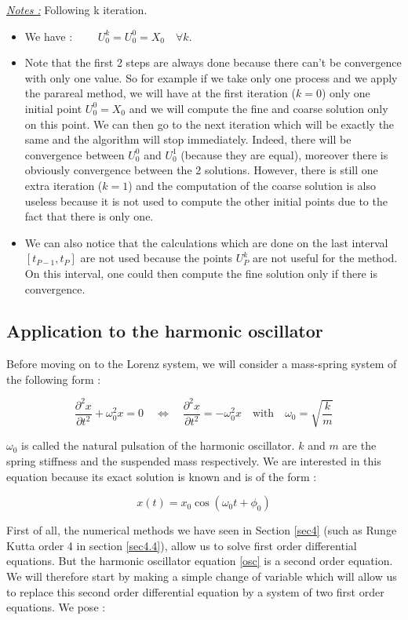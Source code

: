 \noindent \underline{\textit{Notes :}} Following k iteration.
\begin{itemize}
	\item We have : $\qquad U_0^k=U_0^0=X_0 \quad \forall k$.
	\item Note that the first 2 steps are always done because there can't be convergence with only one value. So for example if we take only one process and we apply the parareal method, we will have at the first iteration ($k=0$) only one initial point $U_0^0=X_0$ and we will compute the fine and coarse solution only on this point. We can then go to the next iteration which will be exactly the same and the algorithm will stop immediately. Indeed, there will be convergence between $U_0^0$ and $U_0^1$ (because they are equal), moreover there is obviously convergence between the 2 solutions. However, there is still one extra iteration ($k=1$) and the computation of the coarse solution is also useless because it is not used to compute the other initial points due to the fact that there is only one.
	\item We can also notice that the calculations which are done on the last interval $[t_{P-1},t_P]$ are not used because the points $U_P^k$ are not useful for the method. On this interval, one could then compute the fine solution only if there is convergence.
\end{itemize}

\subsection{Application to the harmonic oscillator}

\noindent Before moving on to the Lorenz system, we will consider a mass-spring system of the following form :

\begin{equation}
	\frac{\partial^2 x}{\partial t^2}+\omega_0^2 x = 0 \quad \iff \quad \frac{\partial^2 x}{\partial t^2}=-\omega_0^2 x \quad \text{with} \quad \omega_0=\sqrt{\frac{k}{m}}
	\label{osc}
\end{equation}

\noindent $\omega_0$ is called the natural pulsation of the harmonic oscillator. $k$ and $m$ are the spring stiffness and the suspended mass respectively. We are interested in this equation because its exact solution is known and is of the form :

$$x(t) = x_0 \cos(\omega_{0}t+\phi_0)$$

\noindent First of all, the numerical methods we have seen in Section \ref{sec4} (such as Runge Kutta order 4 in section \ref{sec4.4}), allow us to solve first order differential equations. But the harmonic oscillator equation \ref{osc} is a second order equation. We will therefore start by making a simple change of variable which will allow us to replace this second order differential equation by a system of two first order equations. We pose :
 
